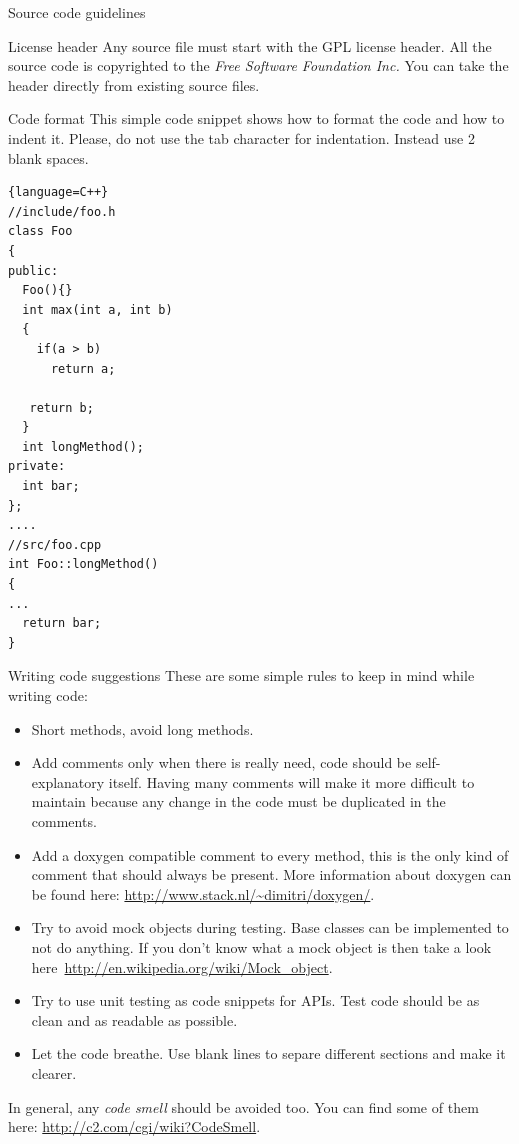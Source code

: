 \documentclass[12pt]{article}
\begin{document}
\begin{section}{Source code guidelines}

\begin{subsection}{License header}
Any source file must start with the GPL license header.  All the
source code is copyrighted to the \textit{Free Software Foundation
  Inc.}
You can take the header directly from existing source files.
\end{subsection}

\begin{subsection}{Code format}
This simple code snippet shows how to format the code and how to indent it.
Please, do not use the tab character for indentation. Instead use 2 blank spaces. 

\begin{lstlisting}{language=C++}
//include/foo.h
class Foo
{
public:
  Foo(){}
  int max(int a, int b)
  {
    if(a > b)
      return a;

   return b;
  }
  int longMethod();
private:
  int bar;
};
....
//src/foo.cpp
int Foo::longMethod()
{
...
  return bar;
}
\end{lstlisting}
\end{subsection}

\begin{subsection}{Writing code suggestions}
These are some simple rules to keep in mind while writing code:
\begin{itemize}
\item Short methods, avoid long methods.
\item Add comments only when there is really need, code should be
  self-explanatory itself. Having many comments will make it more difficult to
  maintain because any change in the code must be duplicated in the
  comments.
\item Add a doxygen compatible comment to every method, this is the
  only kind of comment that should always be present. More information
  about doxygen can be found here:
  \url{http://www.stack.nl/~dimitri/doxygen/}.
\item Try to avoid mock objects during testing. Base classes can be
  implemented to not do anything. If you don't know what a mock
  object is then take a look
  here~\url{http://en.wikipedia.org/wiki/Mock_object}.
\item Try to use unit testing as code snippets for APIs. Test
  code should be as clean and as readable as possible.
\item Let the code breathe. Use blank lines to separe different
  sections and make it clearer.
\end{itemize}
\end{subsection}
In general, any \textit{code smell} should be avoided too. You can
find some of them here: \url{http://c2.com/cgi/wiki?CodeSmell}.
\end{section}
\clearpage
\end{document}
